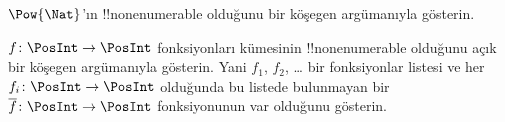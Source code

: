 \begin{prob}
$\Pow{\Nat}$'ın !!{nonenumerable} olduğunu bir köşegen argümanıyla gösterin.
\end{prob}

\begin{prob}\label{sfr:siz:nen:prob:f-posint}
$f\colon\PosInt\to\PosInt$ fonksiyonları kümesinin !!{nonenumerable}
olduğunu açık bir köşegen argümanıyla gösterin. Yani $f_1$, $f_2$, \dots{}
bir fonksiyonlar listesi ve her $f_i\colon\PosInt\to\PosInt$ olduğunda bu
listede bulunmayan bir $\overline{f}\colon\PosInt\to\PosInt$ fonksiyonunun
var olduğunu gösterin.
\end{prob}

